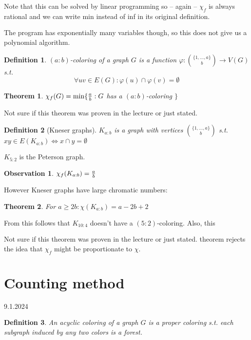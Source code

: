 \documentclass{article}
\newtheorem*{theorem}{Theorem}
\newtheorem*{definition}{Definition}
\newtheorem*{observation}{Observation}
\begin{document}
\noindent
Note that this can be solved by linear programming so -- again -- $\chi_f$ is
always rational and we can write min instead of inf in its original definition.

The program has exponentially many variables though, so this does not give us a
polynomial algorithm.

\begin{definition}
	\emph{$(a:b)$-coloring} of a graph $G$ is a function $\varphi:
	\binom{\{1, ..., a\}}{b} \rightarrow V(G)$ s.t.
	$$ \forall uv \in E(G): \varphi(u) \cap \varphi(v) = \emptyset $$
\end{definition}

\begin{theorem}
	$\chi_f(G) = \min \{ {a \over b} : G$ has a $(a : b)$-coloring $\}$
\end{theorem}

\noindent
Not sure if this theorem was proven in the lecture or just stated.

\begin{definition}[Kneser graphs]
	$K_{a:b}$ is a graph with vertices $\binom{\{1,...,a\}}{b}$ s.t. $xy
	\in E(K_{a:b}) \Leftrightarrow x \cap y = \emptyset$
\end{definition}

\noindent
$K_{5:2}$ is the Peterson graph.

\begin{observation}
	$\chi_f(K_{a:b}) = {a \over b}$
\end{observation}

\noindent
However Kneser graphs have large chromatic numbers:

\begin{theorem}
	For $a \ge 2b: \chi(K_{a:b}) = a - 2b + 2$
\end{theorem}

\noindent
From this follows that $K_{10:4}$ doesn't have a $(5:2)$-coloring. Also, this

\noindent
Not sure if this theorem was proven in the lecture or just stated.
theorem rejects the idea that $\chi_f$ might be proportionate to $\chi$.


\newpage
\section{Counting method} %
9.1.2024

\begin{definition}
	An \emph{acyclic coloring} of a graph $G$ is a proper coloring s.t.
	each subgraph induced by any two colors is a forest.
\end{definition}
\end{document}
